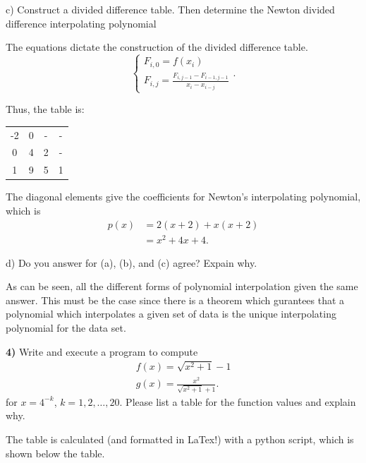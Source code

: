 \documentclass[12pt,a4paper]{article}
\newcommand{\prob}[2]{\textbf{#1)} #2}
\begin{document}
c) Construct a divided difference table.
Then determine the Newton divided difference interpolating polynomial

The equations dictate the construction of the divided difference table.
\[
\begin{cases}
    F_{i,0} = f\left( x_{i} \right) \\
    F_{i,j} = \frac{F_{i,j-1} - F_{i-1,j-1}}{x_{i} - x_{i-j}}
\end{cases}
.\]

Thus, the table is:

\begin{table}[H]
   \begin{center}
       \begin{tabular}{c||c|c|c}
           -2 & 0 & - & - \\
           0 & 4 & 2 & - \\
           1 & 9 & 5 & 1
       \end{tabular}
   \end{center} 
\end{table}

The diagonal elements give the coefficients for Newton's interpolating polynomial, which is
\begin{align*}
    p\left( x \right) &= 2\left( x+2 \right) + x\left( x+2 \right) \\
    &= x^2 + 4x + 4 
.\end{align*}

d) Do you answer for (a), (b), and (c) agree? Expain why.

As can be seen, all the different forms of polynomial interpolation given the same answer.
This must be the case since there is a theorem which gurantees that a polynomial which interpolates a given set of data is the unique interpolating polynomial for the data set.

\prob{4}{Write and execute a program to compute
    \begin{align*}
     f\left( x \right) = \sqrt{x^2 + 1} - 1 \\
     g\left( x \right) = \frac{x^2}{\sqrt{x^2 + 1} + 1} 
    .\end{align*}
for $x=4^{-k}$, $k=1,2,\ldots,20$. Please list a table for the function values and explain why.}

The table is calculated (and formatted in LaTex!) with a python script, which is shown below the table.

\begin{table}[H]
    \begin{center}
         
    \end{center}
\end{table}
\end{document}
